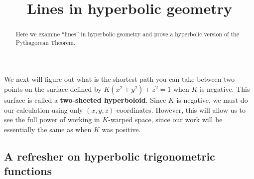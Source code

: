 \documentclass[newpage,hints,,12pt,noauthor,nooutcomes,handout]{ximera}
\title{Lines in hyperbolic geometry}
\begin{document}
\begin{abstract}
Here we examine ``lines'' in hyperbolic geometry and prove a
hyperbolic version of the Pythagorean Theorem.
\end{abstract}
\maketitle



We next will figure out what is the shortest path you can take between
two points on the surface defined by $K(x^2+y^2)+z^2=1$ when $K$ is
negative. This surface is called a \textbf{two-sheeted
  hyperboloid}. Since $K$ is negative, we must do our calculation
using only $(x,y,z)$-coordinates. However, this will allow us to see
the full power of working in $K$-warped space, since our work will be
essentially the same as when $K$ was positive.




\subsection{A refresher on hyperbolic trigonometric functions}
\end{document}
